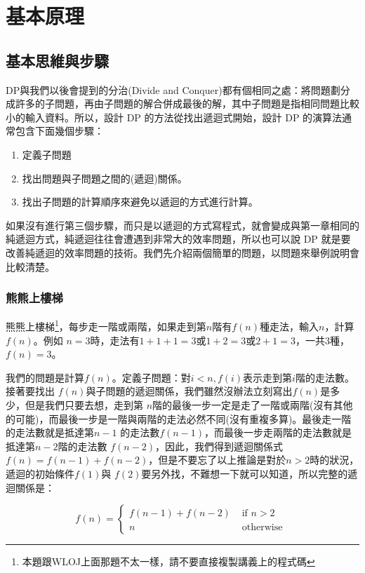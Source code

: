 \documentclass[a4paper, 11pt, oneside]{book}
\begin{document}
\section{基本原理}
\subsection{基本思維與步驟}
DP與我們以後會提到的分治(Divide and Conquer)都有個相同之處：將問題劃分成許多的子問題，再由子問題的解合併成最後的解，其中子問題是指相同問題比較小的輸入資料。所以，設計 DP 的方法從找出遞迴式開始，設計 DP 的演算法通常包含下面幾個步驟：

\begin{enumerate}
    \item 定義子問題
    \item 找出問題與子問題之間的(遞迴)關係。
    \item 找出子問題的計算順序來避免以遞迴的方式進行計算。
\end{enumerate}

如果沒有進行第三個步驟，而只是以遞迴的方式寫程式，就會變成與第一章相同的純遞迴方式，純遞迴往往會遭遇到非常大的效率問題，所以也可以說 DP 就是要改善純遞迴的效率問題的技術。我們先介紹兩個簡單的問題，以問題來舉例說明會比較清楚。

\subsubsection{熊熊上樓梯}
熊熊上樓梯\footnote{本題跟WLOJ上面那題不太一樣，請不要直接複製講義上的程式碼}，每步走一階或兩階，如果走到第$n$階有$f(n)$種走法，輸入$n$，計算$f(n)$。例如 $n=3$時，走法有$1+1+1=3$或$1+2=3$或$2+1=3$，一共$3$種，$f(n)=3$。


我們的問題是計算$f(n)$。定義子問題：對$i<n, f(i)$表示走到第$i$階的走法數。接著要找出 $f(n)$與子問題的遞迴關係，我們雖然沒辦法立刻寫出$f(n)$是多少，但是我們只要去想，走到第 $n$階的最後一步一定是走了一階或兩階(沒有其他的可能)，而最後一步是一階與兩階的走法必然不同(沒有重複多算)。最後走一階的走法數就是抵達第$n-1$ 的走法數$f(n-1)$，而最後一步走兩階的走法數就是抵達第$n-2$階的走法數 $f(n-2)$，因此，我們得到遞迴關係式$f(n)=f(n-1)+f(n-2)$，但是不要忘了以上推論是對於$n>2 $時的狀況，遞迴的初始條件$f(1)$與 $f(2)$要另外找，不難想一下就可以知道，所以完整的遞迴關係是：

\begin{equation}
\label{eq:rec}
f(n)=\left\{\begin{array}{ll}
f(n-1)+f(n-2) & \text { if } n>2 \\
n & \text { otherwise }
\end{array}\right.
\end{equation}
\end{document}
